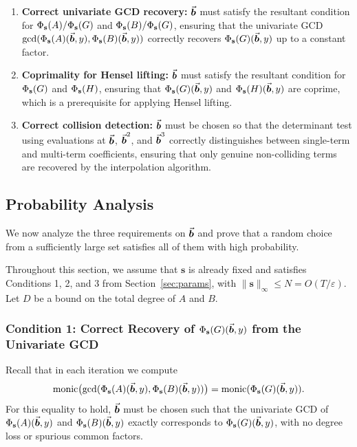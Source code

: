 \documentclass{article}
\numberwithin{equation}{section}
\begin{document}
\begin{enumerate}
    \item \textbf{Correct univariate GCD recovery:} $\vec{\boldsymbol{b}}$ must satisfy the resultant condition for $\Phi_{\mathbf{s}}(A)/\Phi_{\mathbf{s}}(G)$ and $\Phi_{\mathbf{s}}(B)/\Phi_{\mathbf{s}}(G)$, ensuring that the univariate GCD $\gcd(\Phi_{\mathbf{s}}(A)(\vec{\boldsymbol{b}},y), \Phi_{\mathbf{s}}(B)(\vec{\boldsymbol{b}},y))$ correctly recovers $\Phi_{\mathbf{s}}(G)(\vec{\boldsymbol{b}},y)$ up to a constant factor.
    \item \textbf{Coprimality for Hensel lifting:} $\vec{\boldsymbol{b}}$ must satisfy the resultant condition for $\Phi_{\mathbf{s}}(G)$ and $\Phi_{\mathbf{s}}(H)$, ensuring that $\Phi_{\mathbf{s}}(G)(\vec{\boldsymbol{b}},y)$ and $\Phi_{\mathbf{s}}(H)(\vec{\boldsymbol{b}},y)$ are coprime, which is a prerequisite for applying Hensel lifting.
    \item \textbf{Correct collision detection:} $\vec{\boldsymbol{b}}$ must be chosen so that the determinant test using evaluations at $\vec{\boldsymbol{b}}$, $\vec{\boldsymbol{b}}^2$, and $\vec{\boldsymbol{b}}^3$ correctly distinguishes between single-term and multi-term coefficients, ensuring that only genuine non-colliding terms are recovered by the interpolation algorithm.
\end{enumerate}









\subsection*{Probability Analysis}\label{sec:good-point}

We now analyze the three requirements on $\vec{\boldsymbol{b}}$ and prove that a random choice from a sufficiently large set satisfies all of them with high probability.

Throughout this section, we assume that $\mathbf{s}$ is already fixed and satisfies Conditions 1, 2, and 3 from Section~\ref{sec:params}, with $\|\mathbf{s}\|_\infty \le N = O(T/\varepsilon)$. Let $D$ be a bound on the total degree of $A$ and $B$.

\subsubsection*{Condition 1: Correct Recovery of $\Phi_{\mathbf{s}}(G)(\vec{\boldsymbol{b}}, y)$ from the Univariate GCD}

Recall that in each iteration we compute
\[
\operatorname{monic}\bigl( \gcd( \Phi_{\mathbf{s}}(A)(\vec{\boldsymbol{b}}, y), \Phi_{\mathbf{s}}(B)(\vec{\boldsymbol{b}}, y) ) \bigr) = \operatorname{monic}(\Phi_{\mathbf{s}}(G)(\vec{\boldsymbol{b}}, y)).
\]
For this equality to hold, $\vec{\boldsymbol{b}}$ must be chosen such that the univariate GCD of $\Phi_{\mathbf{s}}(A)(\vec{\boldsymbol{b}}, y)$ and $\Phi_{\mathbf{s}}(B)(\vec{\boldsymbol{b}}, y)$ exactly corresponds to $\Phi_{\mathbf{s}}(G)(\vec{\boldsymbol{b}}, y)$, with no degree loss or spurious common factors.
\end{document}
